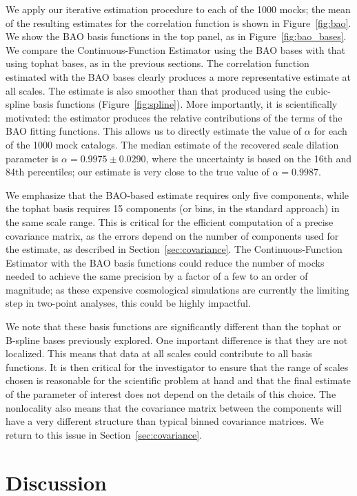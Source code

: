 \documentclass[modern]{aastex62}
\newcommand{\Est}{The Continuous-Function Estimator\xspace}
\newcommand{\est}{the Continuous-Function Estimator\xspace}
\begin{document}
We apply our iterative estimation procedure to each of the 1000 mocks; the mean of the resulting estimates for the correlation function is shown in Figure~\ref{fig:bao}.
We show the BAO basis functions in the top panel, as in Figure~\ref{fig:bao_bases}.
We compare \est using the BAO bases with that using tophat bases, as in the previous sections.
The correlation function estimated with the BAO bases clearly produces a more representative estimate at all scales.
The estimate is also smoother than that produced using the cubic-spline basis functions (Figure~\ref{fig:spline}).
More importantly, it is scientifically motivated: the estimator produces the relative contributions of the terms of the BAO fitting functions.
This allows us to directly estimate the value of $\alpha$ for each of the 1000 mock catalogs.
The median estimate of the recovered scale dilation parameter is $\alpha=0.9975 \pm 0.0290$, where the uncertainty is based on the 16th and 84th percentiles; our estimate is very close to the true value of $\alpha = 0.9987$.

We emphasize that the BAO-based estimate requires only five components, while the tophat basis requires 15 components (or bins, in the standard approach) in the same scale range.
This is critical for the efficient computation of a precise covariance matrix, as the errors depend on the number of components used for the estimate, as described in Section~\ref{sec:covariance}.
\Est with the BAO basis functions could reduce the number of mocks needed to achieve the same precision by a factor of a few to an order of magnitude; as these expensive cosmological simulations are currently the limiting step in two-point analyses, this could be highly impactful.

We note that these basis functions are significantly different than the tophat or B-spline bases previously explored.
One important difference is that they are not localized.
This means that data at all scales could contribute to all basis functions.
It is then critical for the investigator to ensure that the range of scales chosen is reasonable for the scientific problem at hand and that the final estimate of the parameter of interest does not depend on the details of this choice.
The nonlocality also means that the covariance matrix between the components will have a very different structure than typical binned covariance matrices.
We return to this issue in Section~\ref{sec:covariance}.


\section{Discussion} \label{sec:discuss}
\end{document}
